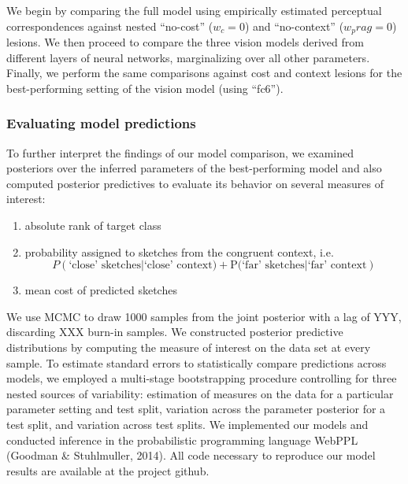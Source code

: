 \documentclass[9pt,twocolumn,twoside]{pnas-new}
\begin{document}
{We begin by comparing the full model using empirically estimated perceptual correspondences against nested ``no-cost'' ($w_c = 0$) and ``no-context'' ($w_prag = 0$) lesions. We then proceed to compare the three vision models derived from different layers of neural networks, marginalizing over all other parameters. Finally, we perform the same comparisons against cost and context lesions for the best-performing setting of the vision model (using ``fc6'').

\subsubsection*{Evaluating model predictions}

To further interpret the findings of our model comparison, we examined posteriors over the inferred parameters of the best-performing model and also computed posterior predictives to evaluate its behavior on several measures of interest:
\begin{enumerate}
    \item absolute rank of target class
    \item probability assigned to sketches from the congruent context, i.e. $$P(\textrm{`close' sketches} | \textrm{`close' context)} + \textrm{P(`far' sketches} | \textrm{`far' context})$$
    \item mean cost of predicted sketches
\end{enumerate}
We use MCMC to draw 1000 samples from the joint posterior with a lag of YYY, discarding XXX burn-in samples.
We constructed posterior predictive distributions by computing the measure of interest on the data set at every sample.
To estimate standard errors to statistically compare predictions across models, we employed a multi-stage bootstrapping procedure controlling for three nested sources of variability: estimation of measures on the data for a particular parameter setting and test split, variation across the parameter posterior for a test split, and variation across test splits.
We implemented our models and conducted inference in the probabilistic programming language WebPPL (Goodman \& Stuhlmuller, 2014).
All code necessary to reproduce our model results are available at the project github.

}

\showmatmethods %


\showacknow{} %



\end{document}
